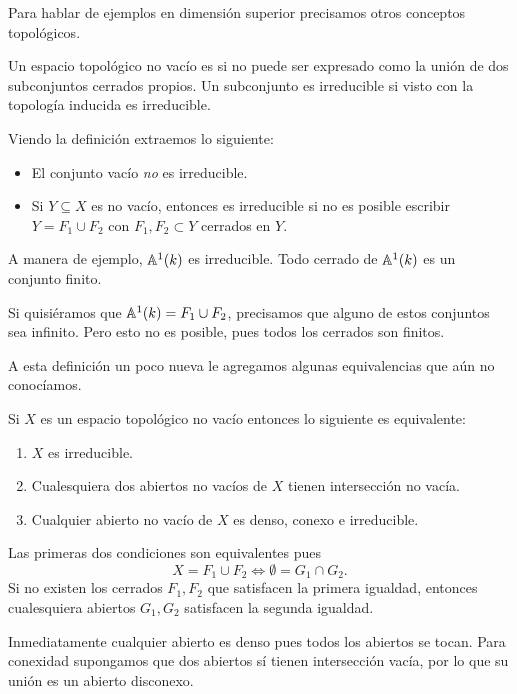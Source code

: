 \documentclass[12pt]{memoir}
\begin{document}
Para hablar de ejemplos en dimensión superior precisamos otros conceptos topológicos.

\begin{Def}\label{def:conj-irreducible}
  Un espacio topológico no vacío es  si no puede ser expresado como la unión de dos subconjuntos cerrados propios. Un subconjunto es irreducible si visto con la topología inducida es irreducible.
\end{Def}

Viendo la definición extraemos lo siguiente:
\begin{itemize}
  \item El conjunto vacío \emph{no} es irreducible.
  \item Si $Y\subseteq X$ es no vacío, entonces es irreducible si no es posible escribir $Y=F_1\cup F_2$ con $F_1,F_2\subset Y$ cerrados en $Y$.
\end{itemize}

\begin{Ex}
  A manera de ejemplo, $\mathbb{A}^1(k)$ es irreducible. Todo cerrado de $\mathbb{A}^1(k)$ es un conjunto finito.\par 
  Si quisiéramos que $\mathbb{A}^1(k)=F_1\cup F_2$, precisamos que alguno de estos conjuntos sea infinito. Pero esto no es posible, pues todos los cerrados son finitos.
\end{Ex}

A esta definición un poco nueva le agregamos algunas equivalencias que aún no conocíamos.

\begin{Prop}\label{prop:equivs-irreducible}
  Si $X$ es un espacio topológico no vacío entonces lo siguiente es equivalente:
  \begin{enumerate}
    \item $X$ es irreducible.
    \item Cualesquiera dos abiertos no vacíos de $X$ tienen intersección no vacía.
    \item Cualquier abierto no vacío de $X$ es denso, conexo e irreducible.
  \end{enumerate}
\end{Prop}

\begin{ptcbp}
  Las primeras dos condiciones son equivalentes pues
  $$X=F_1\cup F_2\iff \emptyset=G_1\cap G_2.$$
  Si no existen los cerrados $F_1,F_2$ que satisfacen la primera igualdad, entonces cualesquiera abiertos $G_1,G_2$ satisfacen la segunda igualdad.\par 
  Inmediatamente cualquier abierto es denso pues todos los abiertos se tocan. Para conexidad supongamos que dos abiertos sí tienen intersección vacía, por lo que su unión es un abierto disconexo.
\end{ptcbp}

\end{document}
